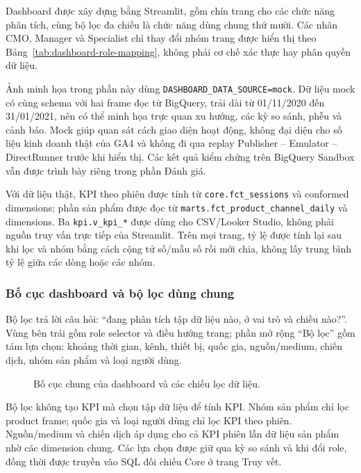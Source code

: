 Dashboard được xây dựng bằng Streamlit, gồm chín trang cho các chức năng phân tích, cùng bộ lọc đa chiều là chức năng dùng chung thứ mười. Các nhãn CMO, Manager và Specialist chỉ thay đổi nhóm trang được hiển thị theo Bảng~\ref{tab:dashboard-role-mapping}, không phải cơ chế xác thực hay phân quyền dữ liệu. \medskip

Ảnh minh họa trong phần này dùng \texttt{DASHBOARD\_DATA\_SOURCE=mock}. Dữ liệu mock có cùng schema với hai frame đọc từ BigQuery, trải dài từ 01/11/2020 đến 31/01/2021, nên có thể minh họa trực quan xu hướng, các kỳ so sánh, phễu và cảnh báo. Mock giúp quan sát cách giao diện hoạt động, không đại diện cho số liệu kinh doanh thật của GA4 và không đi qua replay Publisher -- Emulator -- DirectRunner trước khi hiển thị. Các kết quả kiểm chứng trên BigQuery Sandbox vẫn được trình bày riêng trong phần Đánh giá. \medskip

Với dữ liệu thật, KPI theo phiên được tính từ \texttt{core.fct\_sessions} và conformed dimensions; phần sản phẩm được đọc từ \texttt{marts.fct\_product\_channel\_daily} và dimensions. Ba \texttt{kpi.v\_kpi\_*} được dùng cho CSV/Looker Studio, không phải nguồn truy vấn trực tiếp của Streamlit. Trên mọi trang, tỷ lệ được tính lại sau khi lọc và nhóm bằng cách cộng tử số/mẫu số rồi mới chia, không lấy trung bình tỷ lệ giữa các dòng hoặc các nhóm.

\subsubsection{Bố cục dashboard và bộ lọc dùng chung}

Bộ lọc trả lời câu hỏi: ``đang phân tích tập dữ liệu nào, ở vai trò và chiều nào?''. Vùng bên trái gồm role selector và điều hướng trang; phần mở rộng ``Bộ lọc'' gồm tám lựa chọn: khoảng thời gian, kênh, thiết bị, quốc gia, nguồn/medium, chiến dịch, nhóm sản phẩm và loại người dùng.

\begin{figure}[H]
  \centering
  \caption{Bố cục chung của dashboard và các chiều lọc dữ liệu.}
  \label{fig:ui-global-filters}
\end{figure}

Bộ lọc không tạo KPI mà chọn tập dữ liệu để tính KPI. Nhóm sản phẩm chỉ lọc product frame; quốc gia và loại người dùng chỉ lọc KPI theo phiên. Nguồn/medium và chiến dịch áp dụng cho cả KPI phiên lẫn dữ liệu sản phẩm nhờ các dimension chung. Các lựa chọn được giữ qua kỳ so sánh và khi đổi role, đồng thời được truyền vào SQL đối chiếu Core ở trang Truy vết.

